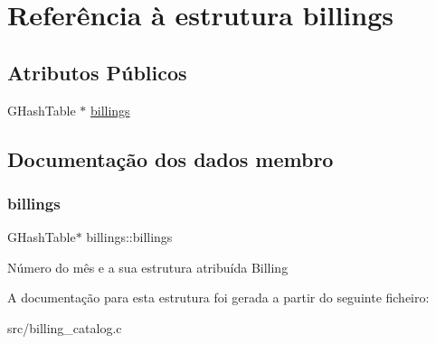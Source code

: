 \hypertarget{structbillings}{}\section{Referência à estrutura billings}
\label{structbillings}
\subsection*{Atributos Públicos}
\begin{DoxyCompactItemize}
\item 
G\+Hash\+Table $\ast$ \hyperlink{structbillings_a96e859eb8d4ca2aa76c542bbd91e1df1}{billings}
\end{DoxyCompactItemize}


\subsection{Documentação dos dados membro}
\mbox{\label{structbillings_a96e859eb8d4ca2aa76c542bbd91e1df1}} 
\subsubsection{\texorpdfstring{billings}{billings}}
{\footnotesize\ttfamily G\+Hash\+Table$\ast$ billings\+::billings}

Número do mês e a sua estrutura atribuída Billing 

A documentação para esta estrutura foi gerada a partir do seguinte ficheiro\+:\begin{DoxyCompactItemize}
\item 
src/billing\+\_\+catalog.\+c\end{DoxyCompactItemize}
